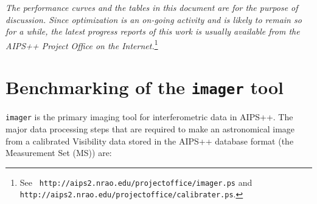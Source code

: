 {\it The performance curves and the tables in this document are for
the purpose of discussion.  Since optimization is an on-going activity
and is likely to remain so for a while, the latest progress reports of
this work is usually available from the AIPS++ Project Office on the
Internet.}\footnote{See {\tt
http://aips2.nrao.edu/projectoffice/imager.ps} and {\tt
http://aips2.nrao.edu/projectoffice/calibrater.ps}.}

\section{Benchmarking of the {\tt imager} tool}
\label{IMAGER}
{\tt imager} is the primary imaging tool for interferometric data in
AIPS++.  The major data processing steps that are required to make an
astronomical image from a calibrated Visibility data stored in the
AIPS++ database format (the Measurement Set (MS)) are:

